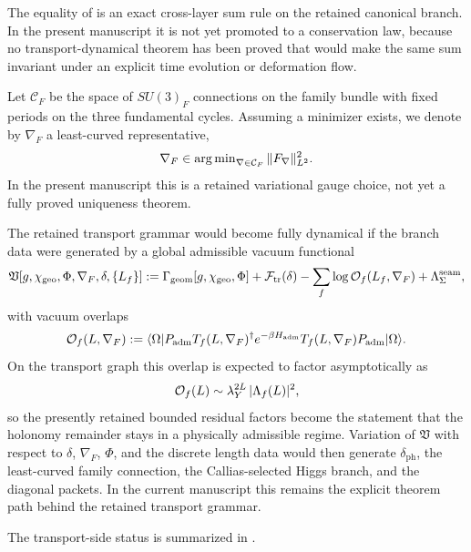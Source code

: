 \begin{remark}
The equality of  is an exact cross-layer sum rule on the retained canonical branch. In the present manuscript it is not yet promoted to a conservation law, because no transport-dynamical theorem has been proved that would make the same sum invariant under an explicit time evolution or deformation flow.
\end{remark}

\begin{construction}
\label{cons:minimal-family-connection}
Let $\mathcal C_F$ be the space of $SU(3)_F$ connections on the family bundle
with fixed periods on the three fundamental cycles. Assuming a minimizer exists,
we denote by $\nabla_F$ a least-curved representative,
\[
\nabla_F \in \operatorname{arg\,min}_{\nabla\in\mathcal C_F}\|F_\nabla\|_{L^2}^2.
\]
In the present manuscript this is a retained variational gauge choice, not yet a
fully proved uniqueness theorem.
\end{construction}

\begin{remark}
The retained transport grammar would become fully dynamical if the branch data were
generated by a global admissible vacuum functional
\[
\mathfrak V[g,\chi_{\mathrm{geo}},\Phi,\nabla_F,\delta,\{L_f\}]
:=
\Gamma_{\mathrm{geom}}[g,\chi_{\mathrm{geo}},\Phi]
+\mathcal F_{\mathrm{tr}}(\delta)
-\sum_f \log \mathcal O_f(L_f,\nabla_F)
+\Lambda_{\Sigma}^{\mathrm{seam}},
\]
with vacuum overlaps
\[
\mathcal O_f(L,\nabla_F)
:=
\langle \Omega|
P_{\mathrm{adm}} T_f(L,\nabla_F)^\dagger e^{-\beta H_{\mathrm{adm}}}
T_f(L,\nabla_F)P_{\mathrm{adm}}
|\Omega\rangle.
\]
On the transport graph this overlap is expected to factor asymptotically as
\[
\mathcal O_f(L)\sim \lambda_Y^{2L}\,|\Lambda_f(L)|^2,
\]
so the presently retained bounded residual factors become the statement that the
holonomy remainder stays in a physically admissible regime. Variation of
$\mathfrak V$ with respect to $\delta$, $\nabla_F$, $\Phi$, and the discrete
length data would then generate $\delta_{\mathrm{ph}}$, the least-curved family
connection, the Callias-selected Higgs branch, and the diagonal packets. In the
current manuscript this remains the explicit theorem path behind the retained
transport grammar.
\end{remark}

The transport-side status is summarized in .

